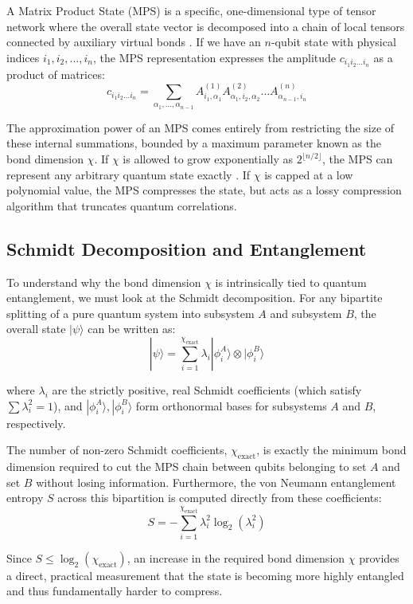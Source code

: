 \documentclass[sigconf, authorversion, nonacm]{acmart}
\begin{document}
A Matrix Product State (MPS) is a specific, one-dimensional type of tensor network where the overall state vector is decomposed into a chain of local tensors connected by auxiliary virtual bonds \cite{Schollwock2011}. If we have an $n$-qubit state with physical indices $i_1, i_2, \dots, i_n$, the MPS representation expresses the amplitude $c_{i_1 i_2 \dots i_n}$ as a product of matrices:
$$ c_{i_1 i_2 \dots i_n} = \sum_{\alpha_1, \dots, \alpha_{n-1}} A^{(1)}_{i_1, \alpha_1} A^{(2)}_{\alpha_1, i_2, \alpha_2} \dots A^{(n)}_{\alpha_{n-1}, i_n} $$

The approximation power of an MPS comes entirely from restricting the size of these internal summations, bounded by a maximum parameter known as the bond dimension $\chi$. If $\chi$ is allowed to grow exponentially as $2^{\lfloor n/2 \rfloor}$, the MPS can represent any arbitrary quantum state exactly \cite{TensorNetworkMPS, Vidal2003}. If $\chi$ is capped at a low polynomial value, the MPS compresses the state, but acts as a lossy compression algorithm that truncates quantum correlations.

\subsection{Schmidt Decomposition and Entanglement}

To understand why the bond dimension $\chi$ is intrinsically tied to quantum entanglement, we must look at the Schmidt decomposition. For any bipartite splitting of a pure quantum system into subsystem $A$ and subsystem $B$, the overall state $|\psi\rangle$ can be written as:
$$ |\psi\rangle = \sum_{i=1}^{\chi_{\text{exact}}} \lambda_i |\phi_i^A\rangle \otimes |\phi_i^B\rangle $$

where $\lambda_i$ are the strictly positive, real Schmidt coefficients (which satisfy $\sum \lambda_i^2 = 1$), and $|\phi_i^A\rangle, |\phi_i^B\rangle$ form orthonormal bases for subsystems $A$ and $B$, respectively.

The number of non-zero Schmidt coefficients, $\chi_{\text{exact}}$, is exactly the minimum bond dimension required to cut the MPS chain between qubits belonging to set $A$ and set $B$ without losing information. Furthermore, the von Neumann entanglement entropy $S$ across this bipartition is computed directly from these coefficients:
$$ S = - \sum_{i=1}^{\chi_{\text{exact}}} \lambda_i^2 \log_2(\lambda_i^2) $$

Since $S \le \log_2(\chi_{\text{exact}})$, an increase in the required bond dimension $\chi$ provides a direct, practical measurement that the state is becoming more highly entangled and thus fundamentally harder to compress.
\end{document}
